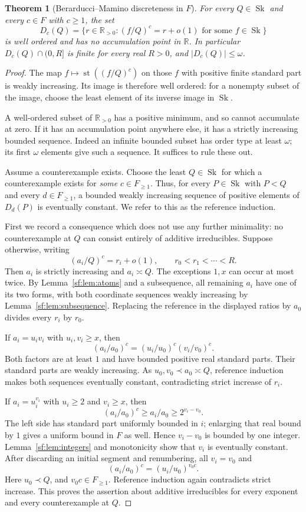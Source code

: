\documentclass[11pt]{article}
\newtheorem{theorem}{Theorem}[section]
\theoremstyle{definition}
\theoremstyle{remark}
\newcommand{\Sk}{\operatorname{Sk}}
\newcommand{\R}{\mathbb R}
\newcommand{\st}{\operatorname{st}}
\newcommand{\arch}{\mathrel{\asymp}}
\numberwithin{equation}{section}
\begin{document}
\begin{theorem}[Berarducci--Mamino discreteness in $F$]\label{sf:thm:discrete}
For every $Q\in\Sk$ and every $c\in F$ with $c\ge1$, the set
\[
 D_c(Q)=\{r\in\R_{>0}:(f/Q)^c=r+o(1)
                         \text{ for some }f\in\Sk\}
\]
is well ordered and has no accumulation point in $\R$.
In particular $D_c(Q)\cap(0,R]$ is finite for every real $R>0$,
and $|D_c(Q)|\le\omega$.
\end{theorem}
\begin{proof}
The map $f\mapsto\st((f/Q)^c)$ on those $f$ with positive finite
standard part is weakly increasing. Its image is therefore well
ordered: for a nonempty subset of the image, choose the least
element of its inverse image in $\Sk$.

A well-ordered subset of $\R_{>0}$ has a positive minimum, and so
cannot accumulate at zero. If it has an accumulation point anywhere
else, it has a strictly increasing bounded sequence. Indeed an
infinite bounded subset has order type at least $\omega$; its first
$\omega$ elements give such a sequence. It suffices to rule these out.

Assume a counterexample exists. Choose the least $Q\in\Sk$ for
which a counterexample exists for \emph{some} $c\in F_{\ge1}$.
Thus, for every $P\in\Sk$ with $P<Q$ and every $d\in F_{\ge1}$,
a bounded weakly increasing sequence of positive elements of $D_d(P)$
is eventually constant. We refer to this as the reference induction.

First we record a consequence which does not use any further
minimality: no counterexample at $Q$ can consist entirely of additive
irreducibles. Suppose otherwise, writing
\[
 (a_i/Q)^c=r_i+o(1),\qquad r_0<r_1<\cdots<R.
\]
Then $a_i$ is strictly increasing and $a_i\arch Q$.
The exceptions $1,x$ can occur at most twice. By
Lemma~\ref{sf:lem:atoms} and a subsequence, all remaining $a_i$ have
one of its two forms, with both coordinate sequences weakly
increasing by Lemma~\ref{sf:lem:subsequence}. Replacing the reference
in the displayed ratios by $a_0$ divides every $r_i$ by $r_0$.

If $a_i=u_iv_i$ with $u_i,v_i\ge x$, then
\[
 (a_i/a_0)^c=(u_i/u_0)^c(v_i/v_0)^c.
\]
Both factors are at least $1$ and have bounded positive real standard
parts. Their standard parts are weakly increasing. As
$u_0,v_0\prec a_0\arch Q$, reference induction makes both
sequences eventually constant, contradicting strict increase of $r_i$.

If $a_i=u_i^{v_i}$ with $u_i\ge2$ and $v_i\ge x$, then
\[
 (a_i/a_0)^c\ge a_i/a_0\ge2^{v_i-v_0}.
\]
The left side has standard part uniformly bounded in $i$; enlarging
that real bound by $1$ gives a uniform bound in $F$ as well. Hence
$v_i-v_0$ is bounded by one integer. Lemma~\ref{sf:lem:integers}
and monotonicity show that $v_i$ is eventually constant. After
discarding an initial segment and renumbering, all $v_i=v_0$ and
\[
 (a_i/a_0)^c=(u_i/u_0)^{v_0c}.
\]
Here $u_0\prec Q$, and $v_0c\in F_{\ge1}$. Reference induction
again contradicts strict increase. This proves the assertion about
additive irreducibles for every exponent and every counterexample at $Q$.


\end{proof}
\end{document}
